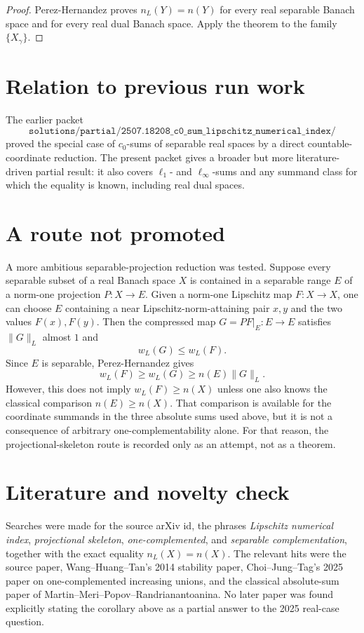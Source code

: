 \documentclass[11pt]{article}
\begin{document}
\begin{proof}
Perez-Hernandez proves \(n_L(Y)=n(Y)\) for every real separable Banach space
and for every real dual Banach space. Apply the theorem to the family
\(\{X_\gamma\}\).
\end{proof}

\section*{Relation to previous run work}

The earlier packet
\[
\texttt{solutions/partial/2507.18208\_c0\_sum\_lipschitz\_numerical\_index/}
\]
proved the special case of \(c_0\)-sums of separable real spaces by a direct
countable-coordinate reduction. The present packet gives a broader but more
literature-driven partial result: it also covers \(\ell_1\)- and
\(\ell_\infty\)-sums and any summand class for which the equality is known,
including real dual spaces.

\section*{A route not promoted}

A more ambitious separable-projection reduction was tested. Suppose every
separable subset of a real Banach space \(X\) is contained in a separable
range \(E\) of a norm-one projection \(P:X\to E\). Given a norm-one
Lipschitz map \(F:X\to X\), one can choose \(E\) containing a near
Lipschitz-norm-attaining pair \(x,y\) and the two values \(F(x),F(y)\). Then
the compressed map \(G=P F|_E:E\to E\) satisfies \(\|G\|_L\) almost \(1\) and
\[
  w_L(G)\leq w_L(F).
\]
Since \(E\) is separable, Perez-Hernandez gives
\[
  w_L(F)\geq w_L(G)\geq n(E)\|G\|_L.
\]
However, this does not imply \(w_L(F)\geq n(X)\) unless one also knows the
classical comparison \(n(E)\geq n(X)\). That comparison is available for the
coordinate summands in the three absolute sums used above, but it is not a
consequence of arbitrary one-complementability alone. For that reason, the
projectional-skeleton route is recorded only as an attempt, not as a theorem.

\section*{Literature and novelty check}

Searches were made for the source arXiv id, the phrases
\emph{Lipschitz numerical index}, \emph{projectional skeleton},
\emph{one-complemented}, and \emph{separable complementation}, together with
the exact equality \(n_L(X)=n(X)\). The relevant hits were the source paper,
Wang--Huang--Tan's 2014 stability paper, Choi--Jung--Tag's 2025 paper on
one-complemented increasing unions, and the classical absolute-sum paper of
Martin--Meri--Popov--Randrianantoanina. No later paper was found explicitly
stating the corollary above as a partial answer to the 2025 real-case
question.
\end{document}
